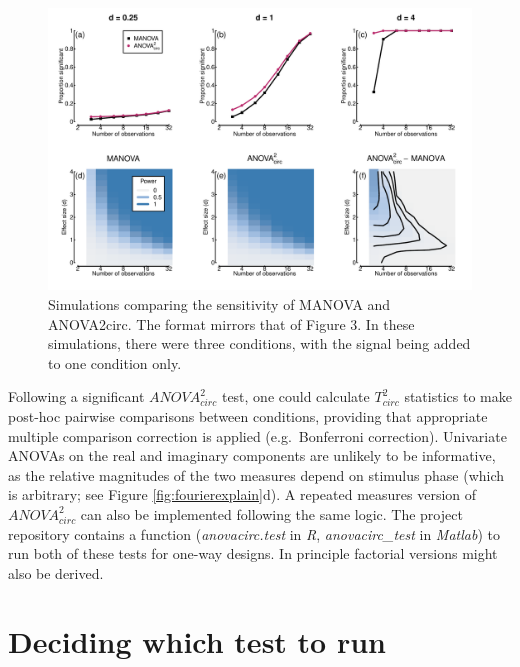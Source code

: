 \documentclass[]{article}
\begin{document}
\begin{figure}

{\centering \includegraphics{figures/powerfig2} 

}

\caption{Simulations comparing the sensitivity of MANOVA and ANOVA2circ. The format mirrors that of Figure 3. In these simulations, there were three conditions, with the signal being added to one condition only.}\label{fig:powerfig2}
\end{figure}

Following a significant \({ANOVA}^2_{circ}\) test, one could calculate \(T^2_{circ}\) statistics to make post-hoc pairwise comparisons between conditions, providing that appropriate multiple comparison correction is applied (e.g.~Bonferroni correction). Univariate ANOVAs on the real and imaginary components are unlikely to be informative, as the relative magnitudes of the two measures depend on stimulus phase (which is arbitrary; see Figure \ref{fig:fourierexplain}d). A repeated measures version of \({ANOVA}^2_{circ}\) can also be implemented following the same logic. The project repository contains a function (\emph{anovacirc.test} in \emph{R}, \emph{anovacirc\_test} in \emph{Matlab}) to run both of these tests for one-way designs. In principle factorial versions might also be derived.

\hypertarget{deciding-which-test-to-run}{%
\section{Deciding which test to run}\label{deciding-which-test-to-run}}
\end{document}
